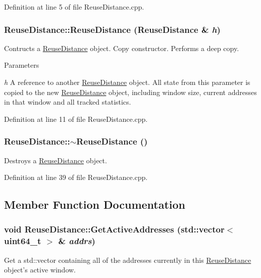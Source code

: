 Definition at line 5 of file ReuseDistance.cpp.

\hypertarget{class_reuse_distance_afff6c1153a623c687e1014df799c286d}{
\subsubsection[{ReuseDistance}]{\setlength{\rightskip}{0pt plus 5cm}ReuseDistance::ReuseDistance ({\bf ReuseDistance} \& {\em h})}}
\label{class_reuse_distance_afff6c1153a623c687e1014df799c286d}
Contructs a \hyperlink{class_reuse_distance}{ReuseDistance} object. Copy constructor. Performs a deep copy.


\begin{DoxyParams}{Parameters}
\item[{\em h}]A reference to another \hyperlink{class_reuse_distance}{ReuseDistance} object. All state from this parameter is copied to the new \hyperlink{class_reuse_distance}{ReuseDistance} object, including window size, current addresses in that window and all tracked statistics. \end{DoxyParams}


Definition at line 11 of file ReuseDistance.cpp.

\hypertarget{class_reuse_distance_a2846a6f2c045759657b754838045900d}{
\subsubsection[{$\sim$ReuseDistance}]{\setlength{\rightskip}{0pt plus 5cm}ReuseDistance::$\sim$ReuseDistance ()}}
\label{class_reuse_distance_a2846a6f2c045759657b754838045900d}
Destroys a \hyperlink{class_reuse_distance}{ReuseDistance} object. 

Definition at line 39 of file ReuseDistance.cpp.



\subsection{Member Function Documentation}
\hypertarget{class_reuse_distance_acc4885040a8a518fc10b5aa4da7d777a}{
\subsubsection[{GetActiveAddresses}]{\setlength{\rightskip}{0pt plus 5cm}void ReuseDistance::GetActiveAddresses (std::vector$<$ uint64\_\-t $>$ \& {\em addrs})}}
\label{class_reuse_distance_acc4885040a8a518fc10b5aa4da7d777a}
Get a std::vector containing all of the addresses currently in this \hyperlink{class_reuse_distance}{ReuseDistance} object's active window.


